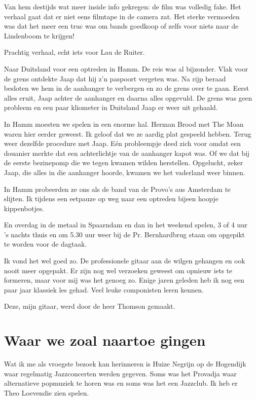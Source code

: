 \documentclass[10pt,twoside,openright]{memoir}
\begin{document}
Van hem destijds wat meer inside info gekregen: de film was volledig fake. Het verhaal gaat dat er niet eens filmtape in de camera zat. Het sterke vermoeden was dat het meer een truc was om bands goedkoop of zelfs voor niets naar de Lindenboom te krijgen!

Prachtig verhaal, echt iets voor Lau de Ruiter.

Naar Duitsland voor een optreden in Hamm. De reis was al bijzonder. Vlak voor de grens ontdekte Jaap dat hij z’n paspoort vergeten was. Na rijp beraad besloten we hem in de aanhanger te verbergen en zo de grens over te gaan. Eerst alles eruit, Jaap achter de aanhanger en daarna alles opgevuld. De grens was geen probleem en een paar kliometer in Duitsland Jaap er weer uit gehaald. 

In Hamm moesten we spelen in een enorme hal. Herman Brood met The Moan waren hier eerder geweest. Ik geloof dat we ze aardig plat gespeeld hebben. Terug weer dezelfde procedure met Jaap. Eén probleempje deed zich voor omdat een douanier merkte dat een achterlichtje van de aanhanger kapot was. Of we dat bij de eerste bezinepomp die we tegen kwamen wilden herstellen. Opgelucht, zeker Jaap, die alles in die aanhanger hoorde, kwamen we het vaderland weer binnen.

In Hamm probeerden ze ons als de band van de Provo’s aus Amsterdam te slijten. Ik tijdens een eetpauze op weg naar een optreden bijeen hoopje kippenbotjes.

En overdag in de metaal in Spaarndam en dan in het weekend spelen, 3 of 4 uur ’s nachts thuis en om 5.30 uur weer bij de Pr. Bernhardbrug staan om opgepikt te worden voor de dagtaak. 

Ik vond het wel goed zo. De professionele gitaar aan de wilgen gehangen en ook nooit meer opgepakt. Er zijn nog wel verzoeken geweest om opnieuw iets te formeren, maar voor mij was het genoeg zo. Enige jaren geleden heb ik nog een paar jaar klassiek les gehad. Veel leuke componisten leren kennen.

Deze, mijn gitaar, werd door de heer Thomson gemaakt. 

\chapter{Waar we zoal naartoe gingen} %
\label{cha:naartoegaan}

Wat ik me als vroegste bezoek kan herinneren is Huize Negrijn op de Hogendijk waar regelmatig Jazzconcerten werden gegeven. Soms was het Provadja waar alternatieve popmuziek te horen was en soms was het een Jazzclub. Ik heb er Theo Loevendie zien spelen.
\end{document}
